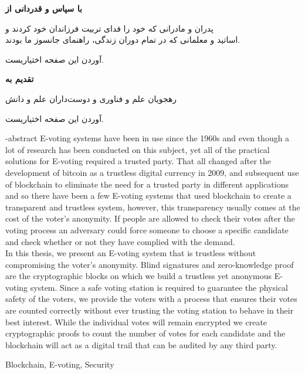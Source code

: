 \documentclass[oneside,openany,msc]{SBU-Thesis}
\begin{document}
{
	\newpage
	\thispagestyle{plain}
	\noindent
	\large{\textbf{با سپاس و قدردانی از}}
	
	\noindent
	پدران و مادرانی که خود را فدای تربیت فرزاندان خود کردند و\\
	اساتید و معلمانی که در تمام دوران زندگی، راهنمای جانسوز ما بودند.
	
	
	\vspace{14cm}	
	آوردن این صفحه اختیاریست.
	
	\pagebreak
}

\rightsPage %
\copyRightPage %

{
	\newpage
	\thispagestyle{plain}
	\large{\textbf{تقدیم به}}
	
	\begin{center}
		رهجويان علم و فناوری و دوست‌داران علم و دانش
	\end{center}
	
	\vspace{14cm}	
	آوردن این صفحه اختیاریست.
	
	\pagebreak
}
\tableofcontents %
\listoffigures \newpage %
\listoftables \newpage %

	
\abstractPage %
		




	

\newpage


\en-abstract
{
E-voting systems have been in use since the 1960s and even though a lot of research has been conducted on this subject, yet all of the practical solutions for E-voting required a trusted party. That all changed after the development of bitcoin as a trustless digital currency in 2009, and subsequent use of blockchain to eliminate the need for a trusted party in different applications and so there have been a few E-voting systems that used blockchain to create a transparent and trustless system, however, this transparency usually comes at the cost of the voter’s anonymity. If people are allowed to check their votes after the voting process an adversary could force someone to choose a specific candidate and check whether or not they have complied with the demand.
\\
In this thesis, we present an E-voting system that is trustless without compromising the voter’s anonymity. Blind signatures and zero-knowledge proof are the cryptographic blocks on which we build a trustless yet anonymous E-voting system. Since a safe voting station is required to guarantee the physical safety of the voters, we provide the voters with a process that ensures their votes are counted correctly without ever trusting the voting station to behave in their best interest. While the individual votes will remain encrypted we create cryptographic proofs to count the number of votes for each candidate and the blockchain will act as a digital trail that can be audited by any third party. 
}

\latinkeywords
{
 Blockchain, E-voting, Security
}

\latinAbstractPage %
\latinFirstPage %

	
\end{document}
